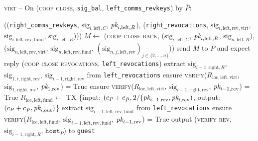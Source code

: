 \begin{center}
\begin{processbox}{\textsc{virt} -- On (\textsc{coop close},
  \texttt{sig\_bal}, \texttt{left\_comms\_revkeys}) by $\bar{P}$:}
\begin{algorithmic}[1]
        ((\texttt{right\_comms\_revkeys}, $\mathrm{sig}_{i, \mathrm{left}, C}$,
        $\textit{pk}_{i, \mathrm{left}, R}$), (\texttt{right\_revocations},
        $\mathrm{sig}_{i, \mathrm{left}, \mathrm{rev}, \mathrm{virt}}$,
        $\mathrm{sig}_{i, \mathrm{left}, \mathrm{rev}, \mathrm{fund}}$,
        $\mathrm{sig}_{i, \mathrm{left}, R}$)))
      \Else \: 
        \State $M \gets$ (\textsc{coop close back}, ($\mathrm{sig}_{i,
        \mathrm{left}, C}$, $\textit{pk}_{i, \mathrm{left}, R}$,  $\mathrm{sig}_{n,
        \mathrm{left}, R}$), ($\mathrm{sig}_{n, \mathrm{left}, \mathrm{rev},
        \mathrm{virt}}$, $\mathrm{sig}_{n, \mathrm{left}, \mathrm{rev},
        \mathrm{fund}}$, $(\mathrm{sig}_{n, j, \mathrm{left}, \mathrm{rev}})_{j
        \in \{2, \dots, n\}}$))
      \EndIf
      \State send $M$ to $\bar{P}$ and expect reply (\textsc{coop close
      revocations}, \texttt{left\_revocations})
      \State extract $\mathrm{sig}_{i-1, \mathrm{right}, R}$,
      $\mathrm{sig}_{1, i, \mathrm{right}, \mathrm{rev}}$, $\mathrm{sig}_{i-1,
      \mathrm{right}, \mathrm{rev}}$ from \texttt{left\_revocations}
      \State ensure \textsc{verify}($R_{\mathrm{loc}, \mathrm{left},
      \mathrm{virt}}$,
      $\mathrm{sig}_{1, \mathrm{right}, \mathrm{rev}}$, $\textit{pk}_{1, \mathrm{rev}}$)
      = True
      \label{code:virtual-layer:coop-close-intermediary:verify-left-virt-rev-start}
      \State ensure \textsc{verify}($R_{\mathrm{loc}, \mathrm{left},
      \mathrm{virt}}$,
      $\mathrm{sig}_{i-1, \mathrm{right}, \mathrm{rev}}$, $\textit{pk}_{i-1,
      \mathrm{rev}}$) = True
      \label{code:virtual-layer:coop-close-intermediary:verify-left-virt-rev-left}
      \State $R_{\mathrm{loc}, \mathrm{left}, \mathrm{fund}} \gets$ TX
      \{input: $(c_P + c_{\bar{P}}, 2/\{\textit{pk}_{i-1,
      \mathrm{rev}}, \textit{pk}_{i, \mathrm{rev}})$, output:
      $(c_P + c_{\bar{P}}, \textit{pk}_{i, \mathrm{out}})$\} 
      \State extract $\mathrm{sig}_{i-1, \mathrm{left}, \mathrm{rev},
      \mathrm{fund}}$ from \texttt{left\_revocations}
      \State ensure \textsc{verify}($R_{\mathrm{loc}, \mathrm{left},
      \mathrm{fund}}$, $\mathrm{sig}_{i-1, \mathrm{left}, \mathrm{rev},
      \mathrm{fund}}$, $\textit{pk}_{i-1, \mathrm{rev}}$) = True
      \label{code:virtual-layer:coop-close-intermediary:verify-left-fund-rev}
      \State output (\textsc{verify rev}, $\mathrm{sig}_{i-1, \mathrm{right},
      R}$, $\texttt{host}_P$) to \texttt{guest}
      \State {}
\end{algorithmic}
\end{processbox}
\end{center}
